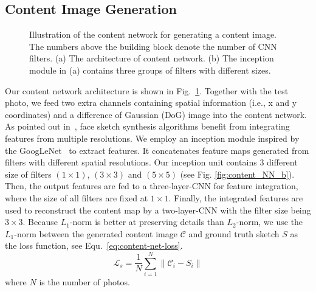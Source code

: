 \documentclass[10pt,twocolumn,letterpaper]{article}
\begin{document}
\subsection{Content Image Generation} \label{sec:content_net}
\begin{figure}[htbp]
\centering
{}
\caption{Illustration of the content network for generating a content image. The numbers above the building block denote the number of CNN filters. (a) The architecture of content network. (b) The inception module in (a) contains three groups of filters with different sizes.}
\label{fig:content_NN}
\end{figure}

Our content network architecture is shown in Fig.~\ref{fig:content_NN}. Together with the test photo, we feed two extra channels containing spatial information (i.e., x and y coordinates) and a difference of Gaussian (DoG) image into the content network. As pointed out in~\cite{wang2009face}, face sketch synthesis algorithms benefit from integrating features from multiple resolutions. We employ an inception module inspired by the GoogLeNet~\cite{szegedy2015going} to extract features. It concatenates feature maps generated from filters with different spatial resolutions. Our inception unit contains 3 different size of filters $(1\times1)$, $(3\times3)$ and $(5\times5)$ (see Fig. \ref{fig:content_NN_b}). Then, the output features are fed to a three-layer-CNN for feature integration, where the size of all filters are fixed at $1\times1$. Finally, the integrated features are used to reconstruct the content map by a two-layer-CNN with the filter size being $3\times3$. Because $L_1$-norm is better at preserving details than $L_2$-norm, we use the $L_1$-norm between the generated content image $\mathcal{C}$ and ground truth sketch $S$ as the loss function, see Equ.~\ref{eq:content-net-loss}.
\begin{equation}
\mathcal{L}_s = \frac{1}{N} \sum \limits_{i=1}^N \|\mathcal{C}_i - S_i\| \label{eq:content-net-loss}
\end{equation}
where $N$ is the number of photos. 
\end{document}
